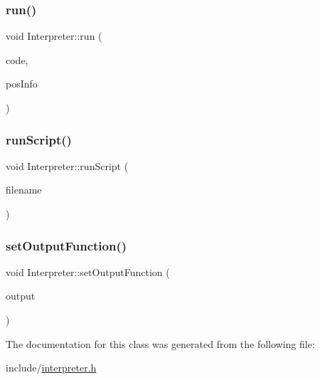 \mbox{\label{classInterpreter_acd0f2550080bcf9c769da5e9b056d005}} 
\subsubsection{\texorpdfstring{run()}{run()}}
{\footnotesize\ttfamily void Interpreter\+::run (\begin{DoxyParamCaption}\item[{const char $\ast$}]{code,  }\item[{\hyperlink{classPosInfo}{Pos\+Info}}]{pos\+Info }\end{DoxyParamCaption})}

\mbox{\label{classInterpreter_a98b6ecfea24f94e180bd1853a39f0a12}} 
\subsubsection{\texorpdfstring{run\+Script()}{runScript()}}
{\footnotesize\ttfamily void Interpreter\+::run\+Script (\begin{DoxyParamCaption}\item[{const char $\ast$}]{filename }\end{DoxyParamCaption})}

\mbox{\label{classInterpreter_a3578606fb7dfe1705aee148a468a39a6}} 
\subsubsection{\texorpdfstring{set\+Output\+Function()}{setOutputFunction()}}
{\footnotesize\ttfamily void Interpreter\+::set\+Output\+Function (\begin{DoxyParamCaption}\item[{\hyperlink{interpreter_8h_a57e80eaa218fd4f66b1d55c833119967}{O\+U\+T\+P\+U\+T\+\_\+\+F\+U\+N\+C\+T\+I\+ON}}]{output }\end{DoxyParamCaption})}



The documentation for this class was generated from the following file\+:\begin{DoxyCompactItemize}
\item 
include/\hyperlink{interpreter_8h}{interpreter.\+h}\end{DoxyCompactItemize}
